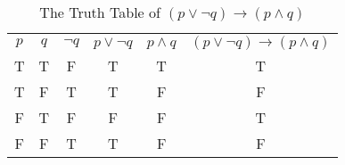 \documentclass{Axon}
\begin{document}
\begin{table}[h]
    \centering
    \begin{tabular}{c|c|c|c|c|c}
        \(p\) & \(q\) & \(\lnot q\) & \(p \lor \lnot q\) & \(p \land q\) & \((p \lor \lnot q) \to (p \land q)\) \\
        T     & T     & F           & T                  & T             & T                                    \\
        T     & F     & T           & T                  & F             & F                                    \\
        F     & T     & F           & F                  & F             & T                                    \\
        F     & F     & T           & T                  & F             & F
    \end{tabular}
    \caption{The Truth Table of \((p \lor \lnot q) \to (p \land q)\)}
    \label{Table: 7}
\end{table}

\printbibliography
\end{document}
